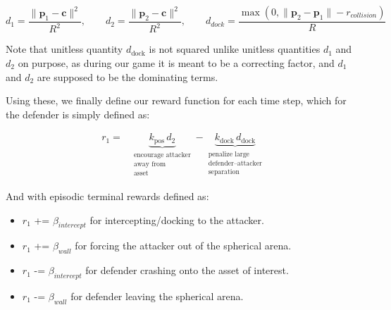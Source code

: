 \[
d_1 = \frac{\|\mathbf{p}_1-\mathbf{c}\|^2}{R^2},\qquad
d_2 = \frac{\|\mathbf{p}_2-\mathbf{c}\|^2}{R^2},\qquad
d_{dock} = \frac{\max(0, \|\mathbf{p}_2-\mathbf{p}_1\| - r_{collision})}{R}
\]



Note that unitless quantity $d_{\text{dock}}$ is not squared unlike unitless quantities $d_1$ and $d_2$ on purpose, as during our game it is meant to be a correcting factor, and $d_1$ and $d_2$ are supposed to be the dominating terms. 

Using these, we finally define our reward function for each time step, which for the defender is simply defined as:


\begin{equation}
\label{eq:defender_step_reward}
\boxed{
\begin{aligned}
r_1
= {}&
\underbrace{k_{\text{pos}}\, d_2}_{\substack{\text{encourage attacker}\\\text{away from}\\\text{asset}}}
-
\underbrace{k_{\text{dock}}\, d_{\text{dock}}}_{\substack{\text{penalize large}\\\text{defender--attacker}\\\text{separation}}}
\end{aligned}
}
\end{equation}



And with episodic terminal rewards defined as:

\begin{itemize}
    \item $r_1$ += $\beta_{intercept}$ for intercepting/docking to the attacker.
    \item $r_1$ += $\beta_{wall}$ for forcing the attacker out of the spherical arena.
    \item $r_1$ -= $\beta_{intercept}$ for defender crashing onto the asset of interest.
    \item $r_1$ -= $\beta_{wall}$ for defender leaving the spherical arena.
    
\end{itemize}

